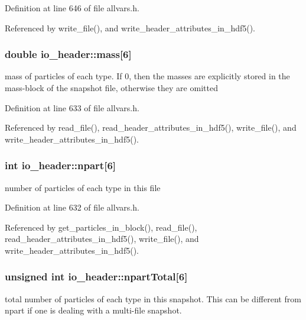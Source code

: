 Definition at line 646 of file allvars.h.



Referenced by write\_\-file(), and write\_\-header\_\-attributes\_\-in\_\-hdf5().

\hypertarget{structio__header_a2c387b0c7c823287d424fedc70175917}{
\subsubsection[{mass}]{\setlength{\rightskip}{0pt plus 5cm}double {\bf io\_\-header::mass}\mbox{[}6\mbox{]}}}
\label{structio__header_a2c387b0c7c823287d424fedc70175917}
mass of particles of each type. If 0, then the masses are explicitly stored in the mass-\/block of the snapshot file, otherwise they are omitted 

Definition at line 633 of file allvars.h.



Referenced by read\_\-file(), read\_\-header\_\-attributes\_\-in\_\-hdf5(), write\_\-file(), and write\_\-header\_\-attributes\_\-in\_\-hdf5().

\hypertarget{structio__header_adc88d581cf3d57eb975a51f587538bdd}{
\subsubsection[{npart}]{\setlength{\rightskip}{0pt plus 5cm}int {\bf io\_\-header::npart}\mbox{[}6\mbox{]}}}
\label{structio__header_adc88d581cf3d57eb975a51f587538bdd}
number of particles of each type in this file 

Definition at line 632 of file allvars.h.



Referenced by get\_\-particles\_\-in\_\-block(), read\_\-file(), read\_\-header\_\-attributes\_\-in\_\-hdf5(), write\_\-file(), and write\_\-header\_\-attributes\_\-in\_\-hdf5().

\hypertarget{structio__header_ad63a8b413a6b56c33bf5ecc25550a6dd}{
\subsubsection[{npartTotal}]{\setlength{\rightskip}{0pt plus 5cm}unsigned int {\bf io\_\-header::npartTotal}\mbox{[}6\mbox{]}}}
\label{structio__header_ad63a8b413a6b56c33bf5ecc25550a6dd}
total number of particles of each type in this snapshot. This can be different from npart if one is dealing with a multi-\/file snapshot. 

